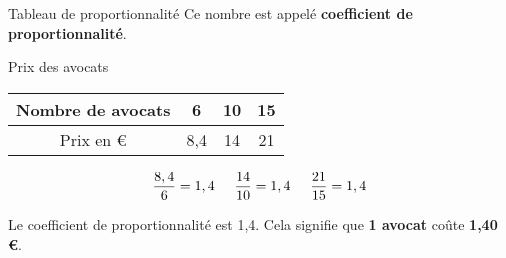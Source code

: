 \begin{pageCours}
\begin{DefT}{Tableau de proportionnalité}
Ce nombre est appelé \textbf{coefficient de proportionnalité}.
\end{DefT}

\begin{ExT}{Prix des avocats}

\begin{minipage}{0.5\linewidth}
\begin{center}
    \begin{tabular}{|c|c|c|c|}\hline 
        Nombre de avocats & 6 & 10 & 15  \\
        \hline Prix en \euro & 8,4 & 14 & 21 \\\hline 
    \end{tabular}
\end{center}
\end{minipage}
\begin{minipage}{0.5\linewidth}
    
\[\frac{8,4}{6}=1,4\hspace{.5cm}\frac{14}{10}=1,4\hspace{.5cm}\frac{21}{15}=1,4\]

Le coefficient de proportionnalité est 1,4. Cela signifie que \textbf{1 avocat} coûte \textbf{1,40 \euro}.
\end{minipage}
\end{ExT}



\end{pageCours} 
